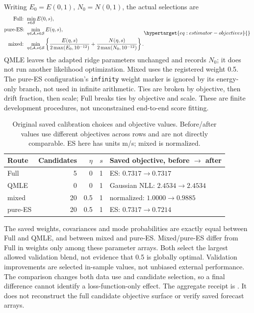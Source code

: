 Writing \(E_0=E(0,1)\), \(N_0=N(0,1)\), the actual selections are
\begin{equation}
\begin{aligned}
\text{Full: }&\min_{s\in\mathcal S} E(0,s),\\
\text{pure-ES: }&\min_{\eta\in\mathcal A,s\in\mathcal S}E(\eta,s),\\
\text{mixed: }&\min_{\eta\in\mathcal A,s\in\mathcal S}
 \left\{\frac{E(\eta,s)}{2\max(E_0,10^{-12})}
       +\frac{N(\eta,s)}{2\max(N_0,10^{-12})}\right\}.
\end{aligned}
\label{eq:estimator-objectives}\hypertarget{eq:estimator-objectives}{}
\end{equation}
QMLE leaves the adapted ridge parameters unchanged and records \(N_0\);
it does not run another likelihood optimization. Mixed uses the registered
weight 0.5. The pure-ES configuration's \texttt{infinity} weight marker is
ignored by its energy-only branch, not used in infinite arithmetic.
Ties are broken by objective, then drift fraction, then scale; Full breaks
ties by objective and scale. These are finite development procedures, not
unconstrained end-to-end score fitting.

\begin{table}[htbp]
\centering\small
\caption{Original saved calibration choices and objective values.
Before/after values use different objectives across rows and are not
directly comparable. ES here has units m/s; mixed is normalized.}
\label{tab:estimator-calibration}\hypertarget{tab:estimator-calibration}{}
\begin{tabular}{lrrrl}
\toprule
Route & Candidates & \(\eta\) & \(s\) & Saved objective, before \(\to\) after\\
\midrule
Full & 5 & 0 & 1 & ES: \(0.7317\to0.7317\)\\
QMLE & 0 & 0 & 1 & Gaussian NLL: \(2.4534\to2.4534\)\\
mixed & 20 & 0.5 & 1 & normalized: \(1.0000\to0.9885\)\\
pure-ES & 20 & 0.5 & 1 & ES: \(0.7317\to0.7214\)\\
\bottomrule
\end{tabular}
\end{table}

The saved weights, covariances and mode probabilities are exactly equal
between Full and QMLE, and between mixed and pure-ES. Mixed/pure-ES differ
from Full in weights only among these parameter arrays. Both select the
largest allowed validation blend, not evidence that 0.5 is globally optimal.
Validation improvements are selected in-sample values, not unbiased external
performance. The comparison changes both data use and candidate selection,
so a final difference cannot identify a loss-function-only effect.
The aggregate receipt is
.
It does not reconstruct the full candidate objective surface or verify
saved forecast arrays.

